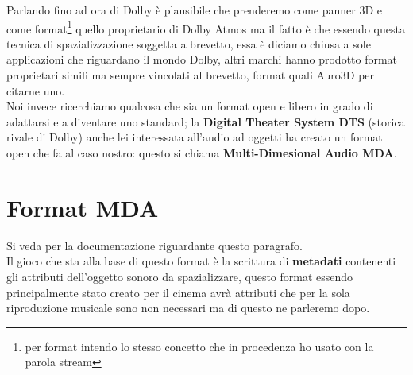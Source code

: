 \documentclass[12pt,a4paper]{report}
\begin{document}
Parlando fino ad ora di Dolby è plausibile che prenderemo come panner 3D e come format\footnote{per format intendo lo stesso concetto che in procedenza ho usato con la parola stream} quello proprietario di Dolby Atmos ma il fatto è che essendo questa tecnica di spazializzazione soggetta a brevetto, essa è diciamo chiusa a sole applicazioni che riguardano il mondo Dolby, altri marchi hanno prodotto format proprietari simili ma sempre vincolati al brevetto, format quali Auro3D per citarne uno.\\

Noi invece ricerchiamo qualcosa che sia un format open e libero in grado di adattarsi e a diventare uno standard; la \textbf{Digital Theater System DTS} (storica rivale di Dolby) anche lei interessata all'audio ad oggetti ha creato un format open che fa al caso nostro: questo si chiama \textbf{Multi-Dimesional Audio MDA}.\\

\section{Format MDA}

Si veda \cite{mda} per la documentazione riguardante questo paragrafo.\\

Il gioco che sta alla base di questo format è la scrittura di \textbf{metadati} contenenti gli attributi dell'oggetto sonoro da spazializzare, questo format essendo principalmente stato creato per il cinema avrà attributi che per la sola riproduzione musicale sono non necessari ma di questo ne parleremo dopo.\\
\end{document}
